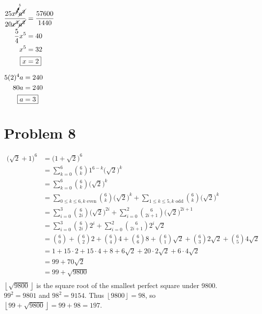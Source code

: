\documentclass{article}
\begin{document}
\centering
\begin{minipage}[t]{0.2\linewidth}
\setlength{\abovedisplayskip}{0pt}
$\begin{aligned}[t]
	\frac{25x^{\cancelto{5}{8}}\cancel{a^2}}
		{20\cancel{x^3}\cancel{a^2}}&=\frac{57600}{1440} \\
	\frac{5}{4}x^5&=40 \\
	x^5&=32 \\
	\Aboxed{x&=2} \\
\end{aligned}$
\end{minipage}
\begin{minipage}[t]{0.2\linewidth}
\setlength{\abovedisplayskip}{0pt}
$\begin{aligned}[t]
	5(2)^4a&=240 \\
	80a&=240 \\
	\Aboxed{a&=3}
\end{aligned}$
\end{minipage}
\flushleft

\section*{Problem 8}
\begin{align*}
	\bigl(\sqrt{2}+1\bigr)^6&=\bigl(1+\sqrt{2}\bigr)^6 \\
	&=\sum_{k=0}^{6}\binom{6}{k}1^{6-k}\bigl(\sqrt{2}\bigr)^k \\
	&=\sum_{k=0}^{6}\binom{6}{k}\bigl(\sqrt{2}\bigr)^k \\
	&=\sum_{0\leq k\leq6,k\text{ even}}\binom{6}{k}
		\bigl(\sqrt{2}\bigr)^k+\sum_{1\leq k\leq5,k\text{ odd}}
		\binom{6}{k}\bigl(\sqrt{2}\bigr)^k \\
	&=\sum_{i=0}^{3}\binom{6}{2i}\bigl(\sqrt{2}\bigr)^{2i}+
		\sum_{i=0}^{2}\binom{6}{2i+1}\bigl(\sqrt{2}\bigr)^{2i+1} \\
	&=\sum_{i=0}^{3}\binom{6}{2i}2^i+
		\sum_{i=0}^{2}\binom{6}{2i+1}2^i\sqrt{2} \\
	&=\binom{6}{0}+\binom{6}{2}2+\binom{6}{4}4+\binom{6}{6}8+
		\binom{6}{1}\sqrt{2}+\binom{6}{3}2\sqrt{2}+
		\binom{6}{5}4\sqrt{2} \\
	&=1+15\cdot2+15\cdot4+8+6\sqrt{2}+20\cdot2\sqrt{2}+
		6\cdot4\sqrt{2} \\
	&=99+70\sqrt{2} \\
	&=99+\sqrt{9800} \\
\end{align*}
$\left\lfloor\sqrt{9800}\right\rfloor$ is the square root of the
smallest perfect square under 9800. $99^2=9801$ and $98^2=9154$.
Thus $\left\lfloor9800\right\rfloor=98$, so $\left\lfloor99+
\sqrt{9800}\right\rfloor=99+98=\boxed{197}$.
\end{document}

